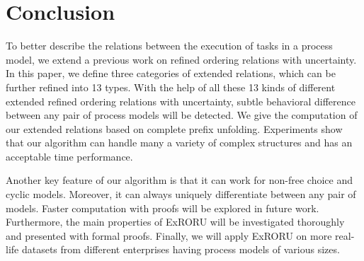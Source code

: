 \documentclass{llncs}
\begin{document}

\section{Conclusion}\label{sec:conclusion}
To better describe the relations between the execution of tasks in a process model, we extend a previous work on refined ordering relations with uncertainty. In this paper, we define three categories of extended relations, which can be further refined into 13 types. With the help of all these 13 kinds of different extended refined ordering relations with uncertainty, subtle behavioral difference between any pair of process models will be detected. We give the computation of our extended relations based on complete prefix unfolding. Experiments show that our algorithm can handle many a variety of complex structures and has an acceptable time performance.

Another key feature of our algorithm is that it can work for non-free choice and cyclic models. Moreover, it can 
always uniquely differentiate between any pair of models. Faster computation with proofs will be explored in future work. Furthermore, the main properties of ExRORU will be investigated thoroughly and presented with formal proofs. Finally, we will apply ExRORU on more real-life datasets from different enterprises having process models of various sizes.




\end{document}
